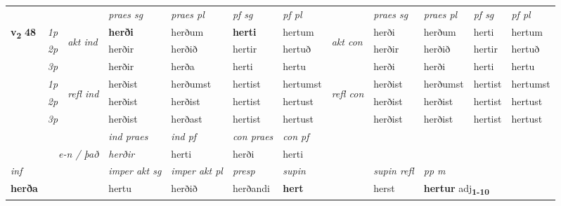 \begin{longtable}[l]{X>{\footnotesize\itshape}llXXXXlXXXX}
 & &   & \textit{praes sg}  & \textit{praes pl}    & \textit{ pf sg} & \textit{pf pl} & & \textit{praes sg}  & \textit{praes pl}    & \textit{pf sg} & \textit{pf pl }  \\ \cmidrule{4-7} \cmidrule{9-12}
 \multirow{2}{*}{{{\textbf{v{\textsubscript{2}}} \Large{\textbf{48}}}}}  & 1p & \multirow{3}{*}{\begin{turn}{90}\textit{akt ind}\end{turn}} & \textbf{herði} & herðum & \textbf{herti} & hertum & \multirow{3}{*}{\begin{turn}{90}\textit{akt con}\end{turn}} &herði & herðum & herti & hertum\\*
 & 2p &  &  herðir  & herðið & hertir & hertuð & & herðir & herðið & hertir & hertuð \\*
 & 3p &  & herðir & herða & herti & hertu & & herði & herði& herti & hertu \\*
\cmidrule{4-7} \cmidrule{9-12}
 & 1p & \multirow{3}{*}{\begin{turn}{90}\textit{refl ind}\end{turn}}  & herðist & herðumst & hertist & hertumst & \multirow{3}{*}{\begin{turn}{90}\textit{refl con}\end{turn}}  &herðist & herðumst & hertist & hertumst \\*
 & 2p &  & herðist & herðist & hertist & hertust & &herðist & herðist & hertist & hertust \\*
 & 3p  & & herðist & herðast & hertist & hertust & & herðist & herðist& hertist & hertust \\*
\cmidrule{4-7} \cmidrule{9-12}

   && &  \textit{ind praes} & \textit{ind pf} & \textit{con praes} & \textit{con pf} \\*
\multicolumn{3}{r}{\textit{e-n / það}} & herðir & herti & herði & herti \\*

\cmidrule{4-7}
   {\textit{inf}} & &  & \textit{imper akt sg} & \textit{imper akt pl}   & \textit{presp} & \textit{supin} && \textit{supin refl} & \textit{pp m} \\*
  {\textbf{herða}} & && hertu  & herðið   & herðandi &  \textbf{hert} && herst & \multicolumn{2}{l}{\textbf{hertur} adj\textbf{\textsubscript{1-10}}} \\*

\midrule


\end{longtable}
